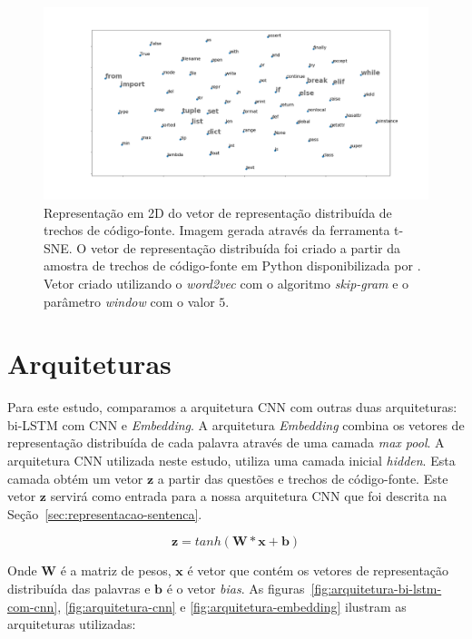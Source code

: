 \begin{figure}[h]
\includegraphics[width=1\textwidth]{figuras/cap-resultados-preliminares/code-tsne-output.png}
\caption{Representação em 2D do vetor de representação distribuída de trechos de código-fonte. Imagem gerada através da ferramenta t-SNE. O vetor de representação distribuída foi criado a partir da amostra de trechos de código-fonte em Python disponibilizada por \cite{yao-2018}. Vetor criado utilizando o \textit{word2vec} com o algoritmo \textit{skip-gram} e o parâmetro \textit{window} com o valor $5$.}
\label{fig:tsne-code-snippet-python}
\end{figure}

\section{Arquiteturas}

Para este estudo, comparamos a arquitetura CNN com outras duas arquiteturas: bi-LSTM com CNN e \textit{Embedding}. A arquitetura \textit{Embedding} combina os vetores de representação distribuída de cada palavra através de uma camada \textit{max pool}. A arquitetura CNN utilizada neste estudo, utiliza uma camada inicial \textit{hidden}.
Esta camada obtém um vetor $\bm{z}$ a partir das questões e trechos de código-fonte. Este vetor $\bm{z}$ servirá como entrada para a nossa arquitetura CNN que foi descrita na Seção~\ref{sec:representacao-sentenca}.

\begin{equation}
    \bm{z} = tanh(\bm{W} * \bm{x} + \bm{b})
\end{equation}

Onde $\bm{W}$ é a matriz de pesos, $\bm{x}$ é vetor que contém os vetores de representação distribuída das palavras e $\bm{b}$ é o vetor \textit{bias}. As figuras~\ref{fig:arquitetura-bi-lstm-com-cnn}, \ref{fig:arquitetura-cnn} e \ref{fig:arquitetura-embedding} ilustram as arquiteturas utilizadas:

